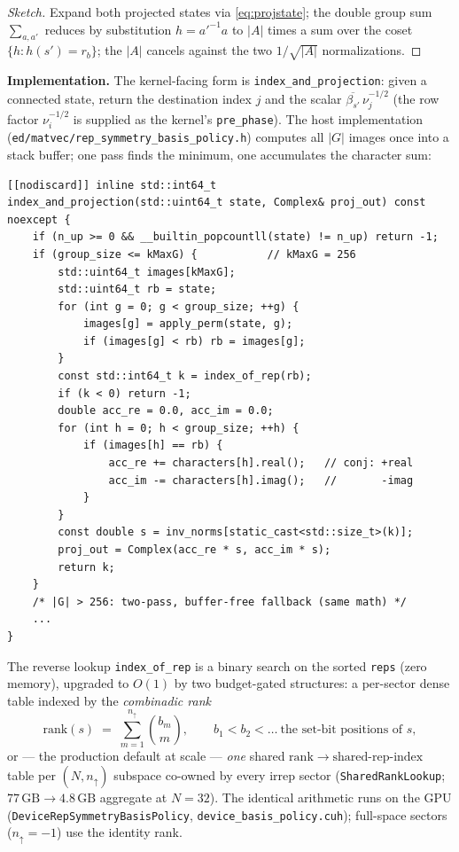 \documentclass[11pt]{article}
\newcommand{\file}[1]{\texttt{\small #1}}
\begin{document}
\begin{proof}[Sketch]
Expand both projected states via \eqref{eq:projstate}; the double group sum
$\sum_{a,a'}$ reduces by substitution $h = a'^{-1} a$ to $|A|$ times a sum
over the coset $\{h : h(s') = r_b\}$; the $|A|$ cancels against the two
$1/\sqrt{|A|}$ normalizations.
\end{proof}

\textbf{Implementation.} The kernel-facing form is
\texttt{index\_and\_projection}: given a connected state, return the
destination index $j$ and the scalar
$\overline{\beta_{s'}}\, \nu_j^{-1/2}$ (the row factor $\nu_i^{-1/2}$ is
supplied as the kernel's \texttt{pre\_phase}). The host implementation
(\file{ed/matvec/rep\_symmetry\_basis\_policy.h}) computes all $|G|$ images
once into a stack buffer; one pass finds the minimum, one accumulates the
character sum:

\begin{lstlisting}
[[nodiscard]] inline std::int64_t
index_and_projection(std::uint64_t state, Complex& proj_out) const noexcept {
    if (n_up >= 0 && __builtin_popcountll(state) != n_up) return -1;
    if (group_size <= kMaxG) {           // kMaxG = 256
        std::uint64_t images[kMaxG];
        std::uint64_t rb = state;
        for (int g = 0; g < group_size; ++g) {
            images[g] = apply_perm(state, g);
            if (images[g] < rb) rb = images[g];
        }
        const std::int64_t k = index_of_rep(rb);
        if (k < 0) return -1;
        double acc_re = 0.0, acc_im = 0.0;
        for (int h = 0; h < group_size; ++h) {
            if (images[h] == rb) {
                acc_re += characters[h].real();   // conj: +real
                acc_im -= characters[h].imag();   //       -imag
            }
        }
        const double s = inv_norms[static_cast<std::size_t>(k)];
        proj_out = Complex(acc_re * s, acc_im * s);
        return k;
    }
    /* |G| > 256: two-pass, buffer-free fallback (same math) */
    ...
}
\end{lstlisting}

The reverse lookup \texttt{index\_of\_rep} is a binary search on the sorted
\texttt{reps} (zero memory), upgraded to $O(1)$ by two budget-gated
structures: a per-sector dense table indexed by the \emph{combinadic rank}
\begin{equation}
  \mathrm{rank}(s) \;=\; \sum_{m=1}^{n_\uparrow} \binom{b_m}{m},
  \qquad b_1 < b_2 < \dots \ \text{the set-bit positions of } s,
  \label{eq:combinadic}
\end{equation}
or --- the production default at scale --- \emph{one} shared
$\mathrm{rank} \to \text{shared-rep-index}$ table per $(N, n_\uparrow)$
subspace co-owned by every irrep sector (\texttt{SharedRankLookup};
$77\,\mathrm{GB} \to 4.8\,\mathrm{GB}$ aggregate at $N=32$). The identical
arithmetic runs on the GPU (\texttt{DeviceRepSymmetryBasisPolicy},
\file{device\_basis\_policy.cuh}); full-space sectors ($n_\uparrow = -1$)
use the identity rank.
\end{document}
